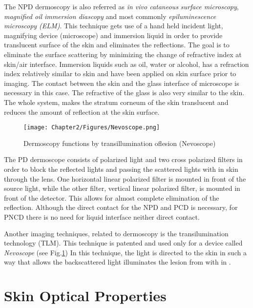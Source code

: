 	
The NPD dermoscopy is also referred as \textit{in vivo cataneous surface microscopy}, \textit{magnified oil immersion  diascopy} and most commonly \textit{epiluminescence microscopy (ELM)}. This technique gets use of a hand held incident light, magnifying device (microscope) and immersion liquid in order to provide translucent surface of the skin and eliminates the reflections. The goal is to eliminate the surface scattering by minimizing the change of refractive index at skin/air interface. Immersion liquids such as oil, water or alcohol, has a refraction index relatively similar to skin and have been applied on skin surface prior to imaging. The contact between the skin and the glass interface of microscope is necessary in this case. The refractive of the glass is also very similar to the skin. 
The whole system, makes the stratum corneum of the skin translucent and reduces the amount of reflection at the skin surface. 

	\begin{figure}[h]
	\centering
	\texttt{[image: Chapter2/Figures/Nevoscope.png]}	
	\caption{Dermoscopy functions by transillumination oflesion (Nevoscope)\cite{Marghoob2003}}
	\label{fig:Nevoscope}
	\end{figure}

The PD dermoscope consists of polarized light and two cross polarized filters in order to block the reflected lights and passing the scattered lights with in skin through the lens. One horizontal linear polarized filter is mounted in front of the source light, while the other filter, vertical linear polarized filter, is mounted in front of the detector. This allows for almost complete elimination of the reflection. 
Although the direct contact for the NPD and PCD is necessary, for PNCD there is no need for liquid interface neither direct contact.


Another imaging techniques, related to dermoscopy is the transilumination technology (TLM). This technique is patented and used only for a device called \textit{Nevoscope} (see Fig.\ref{fig:Nevoscope}) In this technique, the light is directed to the skin in such a way that allows the backscattered light illuminates the lesion from with in \cite{Patwardhan2003,patwardhan2004multi,patwardhan2005monte}.\\



	\section{Skin Optical Properties}
	 
